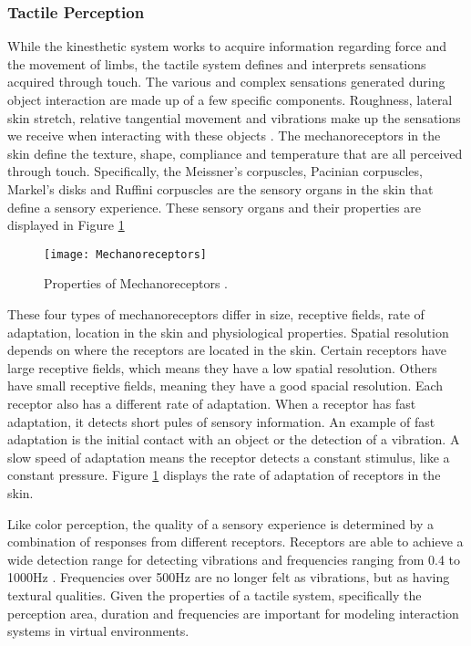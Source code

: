  \subsubsection{Tactile Perception}
 
 


 While the kinesthetic system works to acquire information regarding force and the movement of limbs, the tactile system defines and interprets sensations acquired through touch. The various and complex sensations generated during object interaction are made up of a few specific components. Roughness, lateral skin stretch, relative tangential movement and vibrations make up the sensations we receive when interacting with these objects \cite{mihelj_haptics}. The mechanoreceptors in the skin define the texture, shape, compliance and temperature that are all perceived through touch. Specifically, the Meissner's corpuscles, Pacinian corpuscles, Markel's disks and Ruffini corpuscles are the sensory organs in the skin that define a sensory experience. These sensory organs and their properties are displayed in Figure \ref{fig:Mechanoreceptors}
 
 
  \begin{figure}[h]
 	\centering
 	\texttt{[image: Mechanoreceptors]}
 	\caption{Properties of Mechanoreceptors \cite{mihelj_haptics}.}
 	\label{fig:Mechanoreceptors}
 \end{figure}

 \par These four types of mechanoreceptors differ in size, receptive fields, rate of adaptation, location in the skin and physiological properties. Spatial resolution depends on where the receptors are located in the skin. Certain receptors have large receptive fields, which means they have a low spatial resolution. Others have small receptive fields, meaning they have a good spacial resolution. Each receptor also has a different rate of adaptation. When a receptor has fast adaptation, it detects short pules of sensory information. An example of fast adaptation is the initial contact with an object or the detection of a vibration. A slow speed of adaptation means the receptor detects a constant stimulus, like a constant pressure. Figure \ref{fig:Mechanoreceptors} displays the rate of adaptation of receptors in the skin. 
   


 \par Like color perception, the quality of a sensory experience is determined by a combination of responses from different receptors. Receptors are able to achieve a wide detection range for detecting vibrations and frequencies ranging from 0.4 to 1000Hz \cite{mihelj_haptics}. Frequencies over 500Hz are no longer felt as vibrations, but as having textural qualities. Given the properties of a tactile system, specifically the perception area, duration and frequencies are important for modeling interaction systems in virtual environments.


